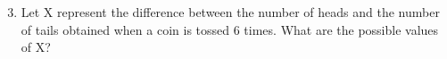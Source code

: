 \documentclass[journal,12pt,onecolumn]{article}
\begin{document}
\begin{enumerate}[label=\arabic*.]
      \setcounter{enumi}{2}
      \item Let X represent the difference between the number of heads and the number of tails obtained when a coin is tossed 6 times. What are the possible values of X?
\end{enumerate}
\end{document}
